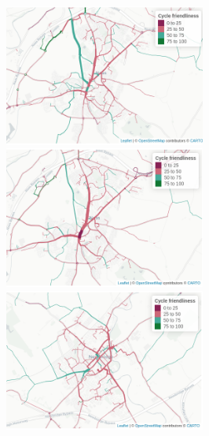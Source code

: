 \documentclass[
  super,
  preprint,
  3p]{elsarticle}
\providecommand{\DIFaddbeginFL}{} %
\providecommand{\DIFaddendFL}{} %
\providecommand{\DIFdelbeginFL}{} %
\providecommand{\DIFdelendFL}{} %
\newcommand{\DIFscaledelfig}{0.5}
\newlength{\DIFdelgraphicswidth} %
\newlength{\DIFdelgraphicsheight} %
\newcommand{\DIFaddincludegraphics}[2][]{{\color{blue}\fbox{\DIFOincludegraphics[#1]{#2}}}} %
\newcommand{\DIFdelincludegraphics}[2][]{%
\sbox{\DIFdelgraphicsbox}{\DIFOincludegraphics[#1]{#2}}%
\settoboxwidth{\DIFdelgraphicswidth}{\DIFdelgraphicsbox} %
\settoboxtotalheight{\DIFdelgraphicsheight}{\DIFdelgraphicsbox} %
\scalebox{\DIFscaledelfig}{%
\parbox[b]{\DIFdelgraphicswidth}{\usebox{\DIFdelgraphicsbox}\\[-\baselineskip] \rule{\DIFdelgraphicswidth}{0em}}\llap{\resizebox{\DIFdelgraphicswidth}{\DIFdelgraphicsheight}{%
\setlength{\unitlength}{\DIFdelgraphicswidth}%
\begin{picture}(1,1)%
\thicklines\linethickness{2pt} %
{\color[rgb]{1,0,0}\put(0,0){\framebox(1,1){}}}%
{\color[rgb]{1,0,0}\put(0,0){\line( 1,1){1}}}%
{\color[rgb]{1,0,0}\put(0,1){\line(1,-1){1}}}%
\end{picture}%
}\hspace*{3pt}}} %
} %
\DeclareRobustCommand{\DIFaddbeginFL}{\DIFOaddbeginFL \let\includegraphics\DIFaddincludegraphics} %
\DeclareRobustCommand{\DIFaddendFL}{\DIFOaddendFL \let\includegraphics\DIFOincludegraphics} %
\DeclareRobustCommand{\DIFdelbeginFL}{\DIFOdelbeginFL \let\includegraphics\DIFdelincludegraphics} %
\DeclareRobustCommand{\DIFdelendFL}{\DIFOaddendFL \let\includegraphics\DIFOincludegraphics} %
\begin{document}
\begin{figure}

\begin{minipage}{0.50\linewidth}
\DIFdelbeginFL %
\DIFdelendFL \DIFaddbeginFL \includegraphics[width=2.60417in,height=\textheight]{naas_quietest_godutch.png}\DIFaddendFL \end{minipage}%
%
\begin{minipage}{0.50\linewidth}
\DIFdelbeginFL %
\DIFdelendFL \DIFaddbeginFL \includegraphics[width=2.60417in,height=\textheight]{naas_fastest_godutch.png}\DIFaddendFL \end{minipage}%
\newline
\begin{minipage}{0.50\linewidth}
\DIFdelbeginFL %
\DIFdelendFL \DIFaddbeginFL \includegraphics[width=2.60417in,height=\textheight]{newbridge_quietest_godutch.png}\DIFaddendFL \end{minipage}%
%
\begin{minipage}{0.50\linewidth}

\end{minipage}
\end{figure}
\end{document}
